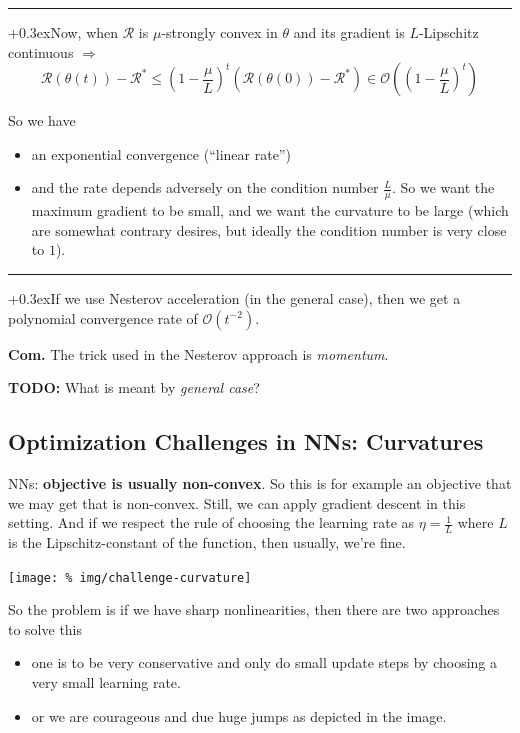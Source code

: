 \documentclass[a2paper,4pt]{extarticle}
\newcommand{\BigO}{\mathcal{O}}
\newcommand{\cR}{\mathcal{R}}
\newcommand{\todo}[1]{\textbf{TODO:} #1}
\newcommand{\todo}[1]{%
}
\newcommand{\customboxpaddingsize}{0pt}
\newcommand{\emptyarg}[1][]{\ifthenelse{\isempty{#1}}{}{\ (#1)}}
\newcommand{\Thm}[1][]{{\setlength\fboxsep{\customboxpaddingsize}
\colorbox{thmcolor}{%
\color{custtitlecolor}{\textbf{T.\emptyarg[#1]}}}\kern+0.3ex}}
\newcommand{\Com}{\textbf{Com.} }
\newcommand{\sep}{\vspace{0pt}\noindent\hrule\vspace{0pt}}
\newcommand{\sep}{\vspace{5pt}\noindent\hrule\vspace{5pt}}
\begin{document}
\begin{landscape}
\begin{multicols*}{7}


\sep

\Thm Now, when $\cR$ is $\mu$-strongly convex in $\theta$ and its gradient is
$L$-Lipschitz continuous $\Longrightarrow$
\[
\cR(\theta(t))
-
\cR^*
\leq
\left(1-\frac{\mu}{L}\right)^t
(\cR(\theta(0))-\cR^*)
\in
\BigO\left(\left(1-\frac{\mu}{L}\right)^t\right)
\]

So we have
\begin{itemize}
  \item an exponential convergence (``linear rate'')
  \item and the rate depends adversely on the condition number $\frac{L}{\mu}$.
  So we want the maximum gradient to be small, and we want the curvature to be
  large (which are somewhat contrary desires, but ideally the condition number
  is very close to $1$).
\end{itemize}

\sep

\Thm If we use Nesterov acceleration (in the general case), then we get a
polynomial convergence rate of $\BigO(t^{-2})$.

\Com The trick used in the Nesterov approach is \emph{momentum}.

\todo{What is meant by \emph{general case}?}

\subsection{Optimization Challenges in NNs: Curvatures}

NNs: \textbf{objective is usually non-convex}. So this is for example
an objective that we may get that is non-convex. Still, we can apply gradient
descent in this setting. And if we respect the rule of choosing the learning
rate as $\eta=\frac{1}{L}$ where $L$ is the Lipschitz-constant of the function,
then usually, we're fine.

\begin{center}
  \texttt{[image: \%
img/challenge-curvature]}
\end{center}

So the problem is if we have sharp nonlinearities, then there are two
approaches to solve this
\begin{itemize}
  \item one is to be very conservative and only do small update steps by
  choosing a very small learning rate.
  \item or we are courageous and due huge jumps as depicted in the image.
\end{itemize}


\end{multicols*}
\end{landscape}
\end{document}
